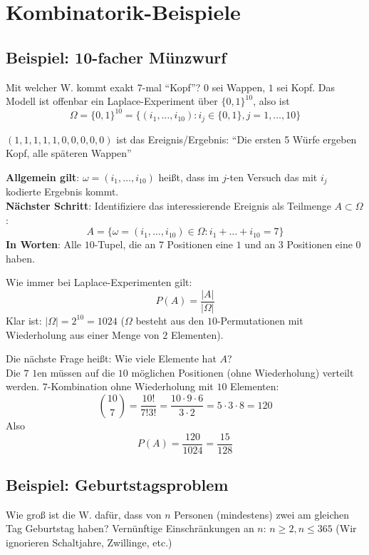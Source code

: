 \section{Kombinatorik-Beispiele}

\subsection{Beispiel: 10-facher Münzwurf}

Mit welcher W. kommt exakt 7-mal ``Kopf''?
$0$ sei Wappen, $1$ sei Kopf.
Das Modell ist offenbar ein Laplace-Experiment über $\{0,1\}^{10}$, also ist 
\[\Omega=\{0,1\}^{10} = \{ (i_1,\ldots,i_{10}) : i_j \in \{0,1\}, j = 1,\ldots,10 \}\]

$(1,1,1,1,1,0,0,0,0,0)$ ist das Ereignis/Ergebnis: ``Die ersten 5 Würfe ergeben Kopf, alle späteren Wappen''

\noindent \textbf{Allgemein gilt}: 
$\omega = (i_1,\ldots,i_{10})$ heißt, dass im $j$-ten Versuch das mit $i_j$ kodierte Ergebnis kommt.\\
\textbf{Nächster Schritt}:
Identifiziere das interessierende Ereignis als Teilmenge $A \subset \Omega$:
\[ A = \{ \omega=(i_1,\ldots,i_{10}) \in \Omega : i_1+\ldots + i_{10} = 7 \} \]
\textbf{In Worten}:
Alle $10$-Tupel, die an $7$ Positionen eine $1$ und an $3$ Positionen eine $0$ haben.

\noindent Wie immer bei Laplace-Experimenten gilt: 
\[P(A) = \frac{|A|}{|\Omega|} \]
Klar ist: $|\Omega| = 2^{10} = 1024$ ($\Omega$ besteht aus den $10$-Permutationen mit Wiederholung aus einer Menge von $2$ Elementen).

\noindent Die nächste Frage heißt: 
Wie viele Elemente hat $A$?\\
Die $7$ $1$en müssen auf die $10$ möglichen Positionen (ohne Wiederholung) verteilt werden.
$7$-Kombination ohne Wiederholung mit $10$ Elementen:
\[ {10 \choose 7} = \frac{10!}{7!3!} = \frac{10\cdot 9 \cdot 6}{3 \cdot 2} = 5 \cdot 3 \cdot 8 = 120 \]
Also \[ P(A) = \frac{120}{1024} = \frac{15}{128} \]

\subsection{Beispiel: Geburtstagsproblem}

Wie groß ist die W. dafür, dass von $n$ Personen (mindestens) zwei am gleichen Tag Geburtstag haben?
Vernünftige Einschränkungen an $n$: $n \geq 2, n \leq 365$ (Wir ignorieren Schaltjahre, Zwillinge, etc.)

